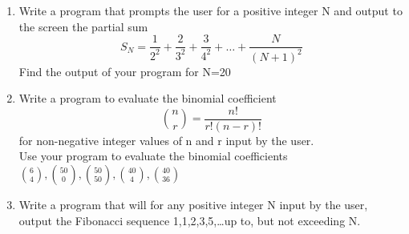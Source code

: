 \documentclass[class=book,crop=false]{standalone}
\begin{document}
\begin{enumerate}
    \item Write a program that prompts the user for a positive integer N and output to the screen the partial sum
    \[S_N=\frac{1}{2^2}+\frac{2}{3^2}+\frac{3}{4^2}+\dots+\frac{N}{(N+1)^2}\]
    Find the output of your program for N=20
    \item Write a program to evaluate the binomial coefficient
     \[\binom{n}{r}=\frac{n!}{r!(n-r)!}\] for non-negative integer values of n and r input by the user.\\
    Use your program to evaluate the binomial coefficients $\displaystyle \binom{6}{4},\binom{50}{0},\binom{50}{50},\binom{40}{4},\binom{40}{36} $ 
    \item Write a program that will for any positive integer N input by the user, output the Fibonacci sequence 1,1,2,3,5,\dots up to, but not exceeding N.
\end{enumerate}
\end{document}
